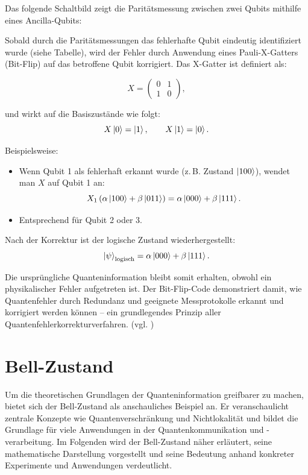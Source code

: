 Das folgende Schaltbild zeigt die Paritätsmessung zwischen zwei Qubits mithilfe eines Ancilla-Qubits:

Sobald durch die Paritätsmessungen das fehlerhafte Qubit eindeutig identifiziert wurde (siehe Tabelle), wird der Fehler durch Anwendung eines Pauli-X-Gatters (Bit-Flip) auf das betroffene Qubit korrigiert. Das X-Gatter ist definiert als:

\[
X = \begin{pmatrix}
0 & 1 \\
1 & 0
\end{pmatrix},
\]

und wirkt auf die Basiszustände wie folgt:
\[
X\ket{0} = \ket{1}, \qquad X\ket{1} = \ket{0}.
\]

Beispielsweise:
\begin{itemize}
    \item Wenn Qubit 1 als fehlerhaft erkannt wurde (z.\,B. Zustand $\ket{100}$), wendet man $X$ auf Qubit 1 an:
    \[
    X_1\left( \alpha\ket{100} + \beta\ket{011} \right) = \alpha\ket{000} + \beta\ket{111}.
    \]
    \item Entsprechend für Qubit 2 oder 3.
\end{itemize}

Nach der Korrektur ist der logische Zustand wiederhergestellt:
\[
\ket{\psi}_\text{logisch} = \alpha\ket{000} + \beta\ket{111}.
\]

Die ursprüngliche Quanteninformation bleibt somit erhalten, obwohl ein physikalischer Fehler aufgetreten ist. Der Bit-Flip-Code demonstriert damit, wie Quantenfehler durch Redundanz und geeignete Messprotokolle erkannt und korrigiert werden können – ein grundlegendes Prinzip aller Quantenfehlerkorrekturverfahren. (vgl. \cite[426 ff.]{nielsen_quantum_2010})

\section{Bell-Zustand}\label{sec:bell_zustand}
Um die theoretischen Grundlagen der Quanteninformation greifbarer zu machen, bietet sich der Bell-Zustand als anschauliches Beispiel an. Er veranschaulicht zentrale Konzepte wie Quantenverschränkung und Nichtlokalität und bildet die Grundlage für viele Anwendungen in der Quantenkommunikation und -verarbeitung. Im Folgenden wird der Bell-Zustand näher erläutert, seine mathematische Darstellung vorgestellt und seine Bedeutung anhand konkreter Experimente und Anwendungen verdeutlicht.

